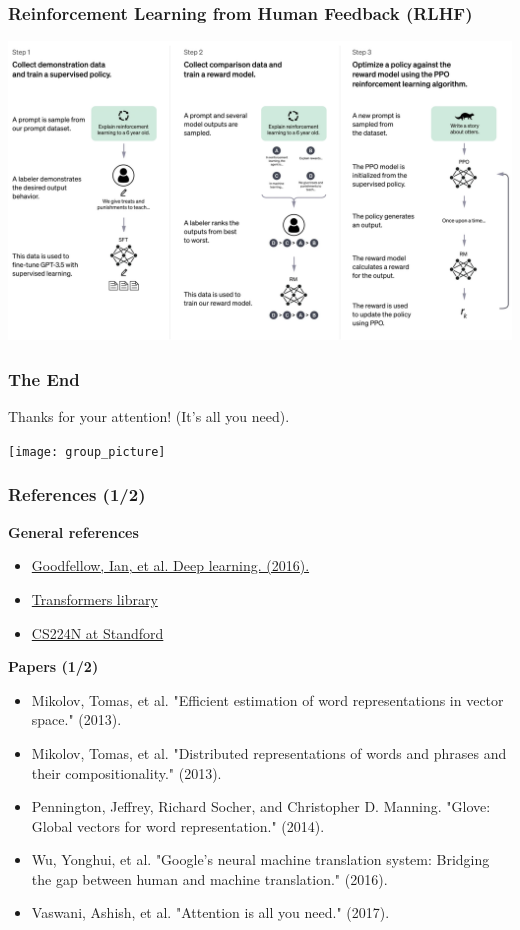 \documentclass{beamer}
\begin{document}
\begin{frame}	
	
	\frametitle{Reinforcement Learning from Human Feedback (RLHF)}
	\pause
	\begin{center}
		\includegraphics[scale=0.163]{rlhf}		
	\end{center}
\end{frame}

\begin{frame}	
	
	\frametitle{The End}
	Thanks for your attention! (It's all you need).
	
	\begin{center}
		\texttt{[image: group\_picture]}		
	\end{center}
\end{frame}

\begin{frame}
	\frametitle{References (1/2)}
	{\footnotesize
	\textbf{General references}
	\begin{itemize}
		\item \href{https://www.deeplearningbook.org/}{Goodfellow, Ian, et al. Deep learning. (2016).}
		\item \href{https://github.com/huggingface/transformers}{Transformers library}
		\item \href{https://web.stanford.edu/class/archive/cs/cs224n/cs224n.1246/}{CS224N at Standford}		
	\end{itemize}
	\textbf{Papers (1/2)}
	\begin{itemize}
	\item Mikolov, Tomas, et al. "Efficient estimation of word representations in vector space." (2013).
	\item Mikolov, Tomas, et al. "Distributed representations of words and phrases and their compositionality." (2013).
	\item Pennington, Jeffrey, Richard Socher, and Christopher D. Manning. "Glove: Global vectors for word representation." (2014).
	\item Wu, Yonghui, et al. "Google's neural machine translation system: Bridging the gap between human and machine translation." (2016).
	\item Vaswani, Ashish, et al. "Attention is all you need." (2017).	
	


\end{itemize}
}
\end{frame}
\end{document}

